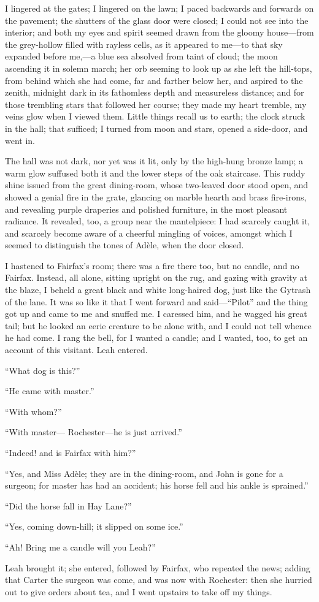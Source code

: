 I lingered at the gates; I lingered on the lawn; I paced backwards and
forwards on the pavement; the shutters of the glass door were closed; I
could not see into the interior; and both my eyes and spirit seemed
drawn from the gloomy house---from the grey-hollow filled with rayless
cells, as it appeared to me---to that sky expanded before me,---a blue
sea absolved from taint of cloud; the moon ascending it in solemn march;
her orb seeming to look up as she left the hill-tops, from behind which
she had come, far and farther below her, and aspired to the zenith,
midnight dark in its fathomless depth and measureless distance; and for
those trembling stars that followed her course; they made my heart
tremble, my veins glow when I viewed them. Little things recall us to
earth; the clock struck in the hall; that sufficed; I turned from moon
and stars, opened a side-door, and went in.

The hall was not dark, nor yet was it lit, only by the high-hung bronze
lamp; a warm glow suffused both it and the lower steps of the oak
staircase. This ruddy shine issued from the great dining-room, whose
two-leaved door stood open, and showed a genial fire in the grate,
glancing on marble hearth and brass fire-irons, and revealing purple
draperies and polished furniture, in the most pleasant radiance. It
revealed, too, a group near the mantelpiece: I had scarcely caught it,
and scarcely become aware of a cheerful mingling of voices, amongst
which I seemed to distinguish the tones of Adèle, when the door closed.

I hastened to \Mrs{} Fairfax's room; there was a fire there too, but no
candle, and no \Mrs{} Fairfax. Instead, all alone, sitting upright on the
rug, and gazing with gravity at the blaze, I beheld a great black and
white long-haired dog, just like the Gytrash of the lane. It was so
like it that I went forward and said---\enquote{Pilot} and the thing got
up and came to me and snuffed me. I caressed him, and he wagged his
great tail; but he looked an eerie creature to be alone with, and I
could not tell whence he had come. I rang the bell, for I wanted a
candle; and I wanted, too, to get an account of this visitant. Leah
entered.

\enquote{What dog is this?}

\enquote{He came with master.}

\enquote{With whom?}

\enquote{With master---\Mr{} Rochester---he is just arrived.}

\enquote{Indeed! and is \Mrs{} Fairfax with him?}

\enquote{Yes, and Miss Adèle; they are in the dining-room, and John is
	gone for a surgeon; for master has had an accident; his horse fell and
	his ankle is sprained.}

\enquote{Did the horse fall in Hay Lane?}

\enquote{Yes, coming down-hill; it slipped on some ice.}

\enquote{Ah! Bring me a candle will you Leah?}

Leah brought it; she entered, followed by \Mrs{} Fairfax, who repeated the
news; adding that \Mr{} Carter the surgeon was come, and was now with \Mr{}
Rochester: then she hurried out to give orders about tea, and I went
upstairs to take off my things.
